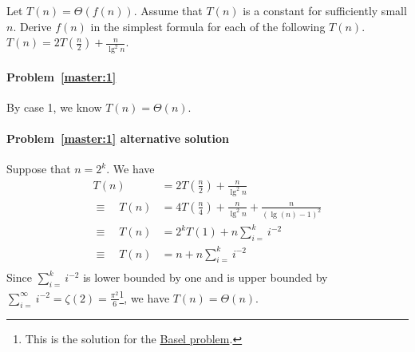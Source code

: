 \begin{Exercise}[origin={NCTU CSIE 104}]
Let $T(n) = \Theta(f(n))$. Assume that $T(n)$ is a constant for sufficiently small $n$. Derive $f(n)$ in the simplest formula for each of the following $T(n)$.
\Question $T(n) = 2T(\frac{n}{2}) + \frac{n}{\lg^2 n}$. \label{master:1}
\end{Exercise}
\begin{Answer}

\paragraph{Problem~\ref{master:1}} By case 1, we know $T(n) = \Theta(n)$.

\paragraph{Problem~\ref{master:1} alternative solution} Suppose that $n = 2^k$. We have
\begin{align*}
T(n) &= 2T(\frac{n}{2}) + \frac{n}{\lg^2 n} \\
\equiv \quad T(n) &= 4T(\frac{n}{4}) + \frac{n}{\lg^2 n} + \frac{n}{(\lg (n)-1)^2} \\
\equiv \quad T(n) &= 2^k T(1) + n \sum_{i=}^k i^{-2} \\
\equiv \quad T(n) &= n + n \sum_{i=}^k i^{-2} \\
\end{align*}
Since $\sum_{i=}^k i^{-2}$ is lower bounded by one and is upper bounded by $\sum_{i=}^{\infty} i^{-2} = \zeta(2) = \frac{\pi^2}{6}$\footnote{This is the solution for the \href{https://en.wikipedia.org/wiki/Basel_problem}{Basel problem}.}, we have $T(n) = \Theta(n)$.
\end{Answer}

